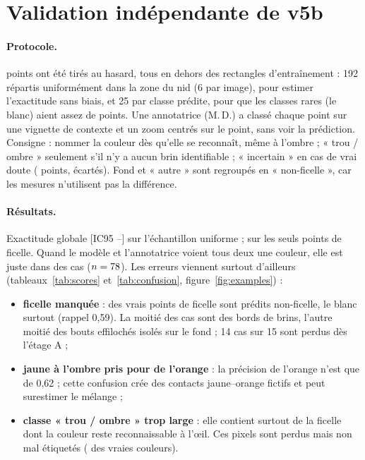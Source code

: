 \documentclass[11pt,a4paper]{article}
\begin{document}
\section{Validation indépendante de v5b}

\paragraph{Protocole.} \valnpoints{} points ont été tirés au hasard, tous en dehors des rectangles
d'entraînement : 192 répartis uniformément dans la zone du nid (6 par image), pour estimer
l'exactitude sans biais, et 25 par classe prédite, pour que les classes rares (le blanc) aient assez de
points. Une annotatrice (M.\,D.) a classé chaque point sur une vignette de contexte et un zoom
centrés sur le point, sans voir la prédiction. Consigne : nommer la couleur dès qu'elle se
reconnaît, même à l'ombre ; « trou / ombre » seulement s'il n'y a aucun brin identifiable ;
« incertain » en cas de vrai doute (\valnunsure{} points, écartés). Fond et « autre » sont regroupés
en « non-ficelle », car les mesures n'utilisent pas la différence.

\paragraph{Résultats.} Exactitude globale \valacc{} [IC95 \valacclo--\valacchi] sur l'échantillon
uniforme ; \valaccstring{} sur les seuls points de ficelle. Quand le modèle et l'annotatrice voient
tous deux une couleur, elle est juste dans \valcolourok{} des cas ($n = 78$).
Les erreurs viennent surtout d'ailleurs (tableaux~\ref{tab:scores} et~\ref{tab:confusion},
figure~\ref{fig:examples}) :
\begin{itemize}
\item \textbf{ficelle manquée} : \valmissed{} des vrais points de ficelle sont prédits non-ficelle,
  le blanc surtout (rappel 0,59). La moitié des cas sont des bords de brins, l'autre moitié des bouts
  effilochés isolés sur le fond ; 14 cas sur 15 sont perdus dès l'étage A ;
\item \textbf{jaune à l'ombre pris pour de l'orange} : la précision de l'orange n'est que de 0,62 ;
  cette confusion crée des contacts jaune--orange fictifs et peut surestimer le mélange ;
\item \textbf{classe « trou / ombre » trop large} : elle contient surtout de la ficelle dont
  la couleur reste reconnaissable à l'œil. Ces pixels sont perdus mais non mal étiquetés
  (\vallostshadow{} des vraies couleurs).
\end{itemize}
\end{document}

